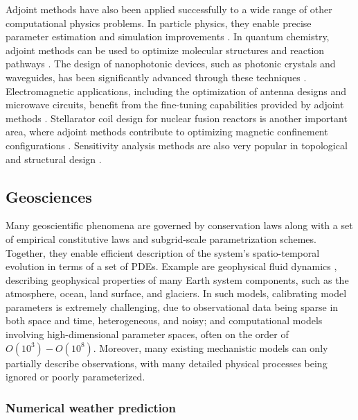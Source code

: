 Adjoint methods have also been applied successfully to a wide range of other computational physics problems. 
In particle physics, they enable precise parameter estimation and simulation improvements \cite{Dorigo.2022}.
In quantum chemistry, adjoint methods can be used to optimize molecular structures and reaction pathways \cite{Arrazola.2021}. 
The design of nanophotonic devices, such as photonic crystals and waveguides, has been significantly advanced through these techniques \cite{Molesky_Lin_Piggott_Jin_Vucković_Rodriguez_2018}. 
Electromagnetic applications, including the optimization of antenna designs and microwave circuits, benefit from the fine-tuning capabilities provided by adjoint methods \cite{Georgieva_Glavic_Bakr_Bandler_2002}. 
Stellarator coil design for nuclear fusion reactors is another important area, where adjoint methods contribute to optimizing magnetic confinement configurations \cite{McGreivy_stellarator_2021}.
Sensitivity analysis methods are also very popular in topological and structural design \cite{min1999optimal, van2005review}.


\subsection{Geosciences}

Many geoscientific phenomena are governed by conservation laws along with a set of empirical constitutive laws and subgrid-scale parametrization schemes. 
Together, they enable efficient description of the system's spatio-temporal evolution in terms of a set of PDEs.
Example are geophysical fluid dynamics \cite{Vallis:2016kv}, describing geophysical properties of many Earth system components, such as the atmosphere, ocean, land surface, and glaciers.
In such models, calibrating model parameters is extremely challenging, due to observational data being sparse in both space and time, heterogeneous, and noisy; and computational models involving high-dimensional parameter spaces, often on the order of $O(10^3) - O(10^8)$.
Moreover, many existing mechanistic models can only partially describe observations, with many detailed physical processes being ignored or poorly parameterized. 


\subsubsection{Numerical weather prediction}
\label{section:meteorlogy}

